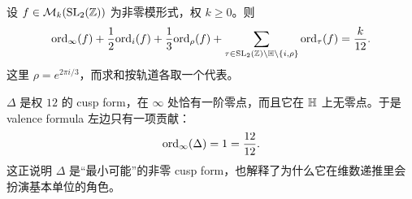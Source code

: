 \begin{lemma}
\label{lem:valence-formula}
设 $f\in \mathcal{M}_k(\mathrm{SL}_2(\mathbb{Z}))$ 为非零模形式，权 $k\ge 0$。则
\[
  \mathrm{ord}_\infty(f)+\frac{1}{2}\mathrm{ord}_i(f)+\frac{1}{3}\mathrm{ord}_\rho(f)
  +\sum_{\tau\in \mathrm{SL}_2(\mathbb{Z})\backslash\mathbb{H}\setminus\{i,\rho\}} \mathrm{ord}_\tau(f)
  =\frac{k}{12}.
\]
这里 $\rho=e^{2\pi i/3}$，而求和按轨道各取一个代表。
\end{lemma}

\begin{example}
\label{ex:valence-delta}
$\Delta$ 是权 $12$ 的 cusp form，在 $\infty$ 处恰有一阶零点，而且它在 $\mathbb{H}$ 上无零点。于是 valence formula 左边只有一项贡献：
\[
  \mathrm{ord}_\infty(\Delta)=1=\frac{12}{12}.
\]
这正说明 $\Delta$ 是“最小可能”的非零 cusp form，也解释了为什么它在维数递推里会扮演基本单位的角色。
\end{example}


